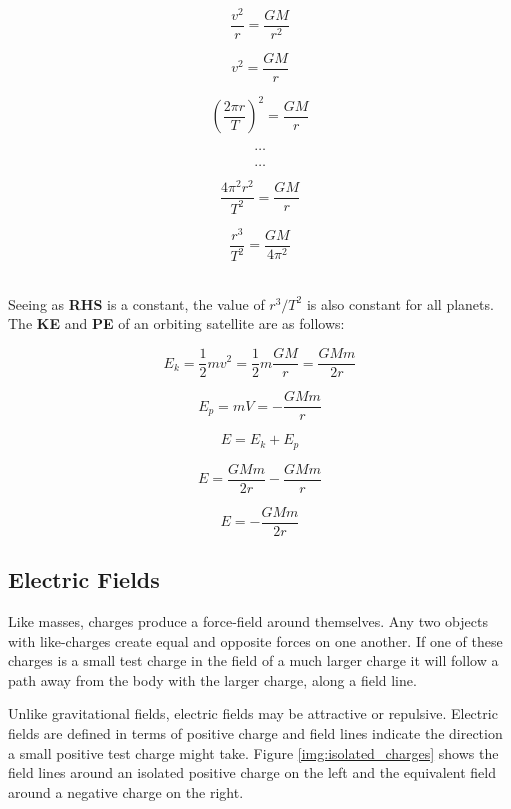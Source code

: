 \documentclass[12pt]{article}
\begin{document}
\begin{figure}[H]
\centering
\begin{minipage}{.8\textwidth}
\begin{tcolorbox}[
sharp corners=all,
colback=white,
colframe=white,
size=tight,
boxrule=0.2mm,
left=10mm, right=10mm,
]
\begin{multicols}{2}
\noindent
\\
\[\dfrac{v^2}{r} = \dfrac{GM}{r^2}\]

\[v^2 = \dfrac{GM}{r}\]

\[\left (\dfrac{2 \pi r}{T} \right )^2 = \dfrac{GM}{r}\]

\[\textbf{\ldots}\]
\columnbreak

\[\textbf{\ldots}\]

\[\dfrac{4 \pi^2 r^2}{T^2} = \dfrac{GM}{r}\]

\[\dfrac{r^3}{T^2} = \dfrac{GM}{4 \pi^2 }\]
\\

\end{multicols}
\end{tcolorbox}
\end{minipage}
\end{figure}

Seeing as \textbf{RHS} is a constant, the value of \(r^3/T^2\) is also constant for all planets. The \textbf{KE} and \textbf{PE} of an orbiting satellite are as follows:

\[E_k = \dfrac{1}{2} m v^2 = \dfrac{1}{2} m \dfrac{GM}{r} = \dfrac{GMm}{2r}\]

\[E_p = mV = -\dfrac{GMm}{r}\]

\[ E = E_k + E_p\]

\[E = \dfrac{GMm}{2r} -\dfrac{GMm}{r} \]

\[E =-\dfrac{GMm}{2r} \]

\subsection{Electric Fields}
\label{sec:org11ee3e6}

Like masses, charges produce a force-field around themselves. Any two objects with like-charges create equal and opposite forces on one another. If one of these charges is a small test charge in the field of a much larger charge it will follow a path away from the body with the larger charge, along a field line.

Unlike gravitational fields, electric fields may be attractive or repulsive. Electric fields are defined in terms of positive charge and field lines indicate the direction a small positive test charge might take. Figure \ref{img:isolated_charges} shows the field lines around an isolated positive charge on the left and the equivalent field around a negative charge on the right.
\end{document}
